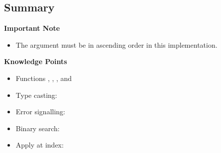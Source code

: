 \subsection{Summary}

\begin{importantblock}
\textbf{Important Note}
\begin{itemize}
\item The argument  must be in ascending order in this implementation.
\end{itemize}
\end{importantblock}

\begin{noteblock}
\textbf{Knowledge Points}
\begin{itemize}
\item Functions \href{https://code.kx.com/q/ref/if/}{}, \href{https://code.kx.com/q/ref/all-any/#all}{}, \href{https://code.kx.com/q/ref/asc/}{}, \href{https://code.kx.com/q/ref/first/#first}{} and \href{https://code.kx.com/q/ref/first/#last}{} 
\item Type casting: \href{https://code.kx.com/q/ref/cast/}{\q{$}}
\item Error signalling: \href{https://code.kx.com/q/ref/signal/}{}
\item Binary search: \href{https://code.kx.com/q/ref/bin/}{}
\item Apply at index: \href{https://code.kx.com/q/ref/apply/#apply-at-index-at}{}
\end{itemize}
\end{noteblock}


\clearpage
